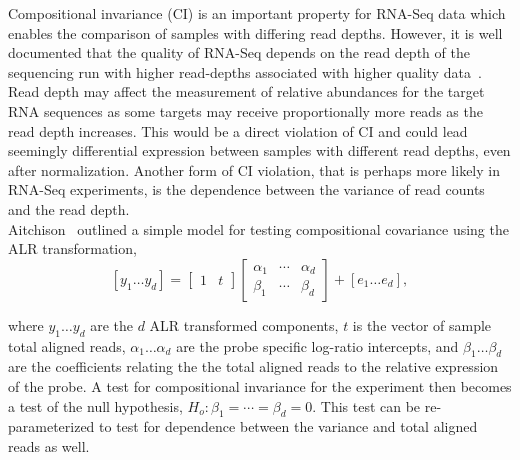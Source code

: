 \documentclass{article}\usepackage[]{graphicx}\usepackage[]{color}
\theoremstyle{definition}
\begin{document}
Compositional invariance (CI) is an important property for RNA-Seq data which enables the comparison of samples with differing read depths.  However, it is well documented that the quality of RNA-Seq depends on the read depth of the sequencing run with higher read-depths associated with higher quality data~\cite{Tarazona2011,Sims2014}. Read depth may affect the measurement of relative abundances for the target RNA sequences as some targets may receive proportionally more reads as the read depth increases.  This would be a direct violation of CI and could lead seemingly differential expression between samples with different read depths, even after normalization.  Another form of CI violation, that is perhaps more likely in RNA-Seq experiments, is the dependence between the variance of read counts and the read depth.\\


Aitchison~\cite{Aitchison1986} outlined a simple model for testing compositional covariance using the ALR transformation,  \\

\begin{equation}
\left[y_1 \ldots y_d \right] = 
\left[
\begin{array}{cc}
1 & t
\end{array}
\right]
\left[
\begin{array}{ccc}
\alpha_1 & \cdots & \alpha_d\\
\beta_1 & \cdots & \beta_d
\end{array}
\right] 
+
\left[e_1 \ldots e_d \right],
\label{matrixModel}
\end{equation}

where $y_1 \ldots y_d$ are the $d$ ALR transformed components, $t$ is the vector of sample total aligned reads, $\alpha_1 \ldots \alpha_d$ are the probe specific log-ratio intercepts, and $\beta_1 \ldots \beta_d$ are the coefficients relating the the total aligned reads to the relative expression of the probe.  A test for compositional invariance for the experiment then becomes a test of the null hypothesis, $H_o: \beta_1 = \cdots = \beta_d = 0$. This test can be re-parameterized to test for dependence between the variance and total aligned reads as well.
\end{document}
